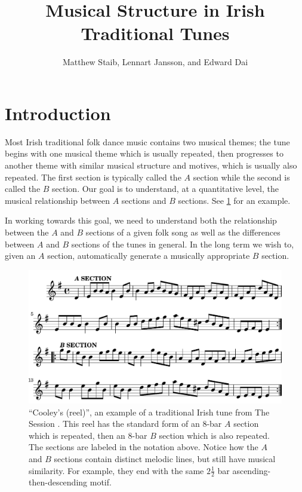 \documentclass{article} %
\title{Musical Structure in Irish Traditional Tunes}
\author{Matthew Staib, Lennart Jansson, and Edward Dai}
\begin{document}
\suppressfloats
\maketitle

\section{Introduction}
Most Irish traditional folk dance music contains two musical themes; the tune
begins with one musical theme which is usually repeated, then progresses to
another theme with similar musical structure and motives, which is usually also
repeated. The first section is typically called the $A$ section while the second
is called the $B$ section. Our goal is to understand, at a quantitative level,
the musical relationship between $A$ sections and $B$ sections. See
\cref{origtune} for an example.

In working towards this goal, we need to understand both the relationship
between the $A$ and $B$ sections of a given folk song as well as the differences
between $A$ and $B$ sections of the tunes in general. In the long term we wish
to, given an $A$ section, automatically generate a musically appropriate $B$
section.

\begin{figure}
  \centering \includegraphics[width=5in]{original_tune-crop.pdf}
  \caption{
    ``Cooley's (reel)'', an example of a traditional Irish tune from The
    Session \cite{thesession}. This reel has the standard form of an 8-bar $A$
    section which is repeated, then an 8-bar $B$ section which is also repeated.
    The sections are labeled in the notation above. Notice how the $A$ and $B$
    sections contain distinct melodic lines, but still have musical similarity.
    For example, they end with the same $2 \frac 1 2$ bar
    ascending-then-descending motif.
  }
  \label{origtune}
\end{figure}
\end{document}
